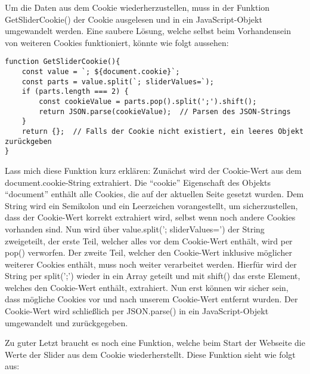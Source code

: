 Um die Daten aus dem Cookie wiederherzustellen, muss in der Funktion GetSliderCookie() der Cookie ausgelesen und in ein JavaScript-Objekt umgewandelt werden. Eine saubere Lösung, welche selbst beim Vorhandensein von weiteren Cookies funktioniert, könnte wie folgt aussehen:

\begin{lstlisting}[style=JavaScript]
function GetSliderCookie(){
    const value = `; ${document.cookie}`;
    const parts = value.split(`; sliderValues=`);
    if (parts.length === 2) {
        const cookieValue = parts.pop().split(';').shift();
        return JSON.parse(cookieValue);  // Parsen des JSON-Strings
    }
    return {};  // Falls der Cookie nicht existiert, ein leeres Objekt zurückgeben
}
\end{lstlisting}

Lass mich diese Funktion kurz erklären: Zunächst wird der Cookie-Wert aus dem document.cookie-String extrahiert. Die \enquote{cookie} Eigenschaft des Objekts \enquote{document} enthält alle Cookies, die auf der aktuellen Seite gesetzt wurden. Dem String wird ein Semikolon und ein Leerzeichen vorangestellt, um sicherzustellen, dass der Cookie-Wert korrekt extrahiert wird, selbst wenn noch andere Cookies vorhanden sind. Nun wird über value.split('; sliderValues=') der String zweigeteilt, der erste Teil, welcher alles vor dem Cookie-Wert enthält, wird per pop() verworfen. Der zweite Teil, welcher den Cookie-Wert inklusive möglicher weiterer Cookies enthält, muss noch weiter verarbeitet werden. Hierfür wird der String per split(';') wieder in ein Array geteilt und mit shift() das erste Element, welches den Cookie-Wert enthält, extrahiert. Nun erst können wir sicher sein, dass mögliche Cookies vor und nach unserem Cookie-Wert entfernt wurden. Der Cookie-Wert wird schließlich per JSON.parse() in ein JavaScript-Objekt umgewandelt und zurückgegeben.

Zu guter Letzt braucht es noch eine Funktion, welche beim Start der Webseite die Werte der Slider aus dem Cookie wiederherstellt. Diese Funktion sieht wie folgt aus:

